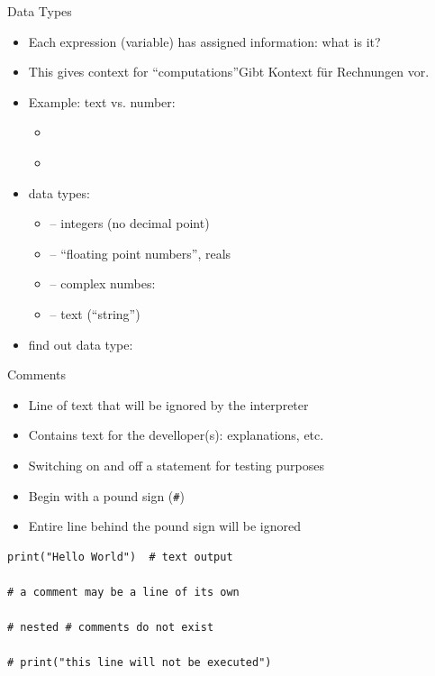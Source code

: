 \begin{frame}{Data Types}
%
\begin{itemize}
\item Each expression (\zB variable) has assigned information: what is it?
\item This gives context for \enquote{computations}Gibt Kontext für Rechnungen vor.
\item Example: text vs. number:
	\begin{itemize}
	\item {} \thus~ 
	\item {} \thus~ 
	\end{itemize}
\item data types:
	\begin{itemize}
	\item {} -- integers (no decimal point)
	\item {} -- \enquote{floating point numbers}, reals
	\item {} -- complex numbes: 
	\item {} -- text (\enquote{string})
	\end{itemize}
\item find out data type: 
\end{itemize}
%
\end{frame}


\begin{frame}[fragile]{Comments}
%
\begin{minipage}[t]{.44\linewidth}
\begin{itemize}
\item Line of text that will be ignored by the interpreter
\item Contains text for the develloper(s): explanations, etc.
\item Switching on and off a statement for testing purposes
\item Begin with a pound sign (\texttt{\#})
\item Entire line behind the pound sign will be ignored
\end{itemize}
\end{minipage}
%
\begin{minipage}[t]{.55\linewidth}
\phantom{x}
\begin{codebox}
\begin{verbatim}
print("Hello World")  # text output

# a comment may be a line of its own

# nested # comments do not exist

# print("this line will not be executed")
\end{verbatim}
\end{codebox}
\end{minipage}
%
\end{frame}
